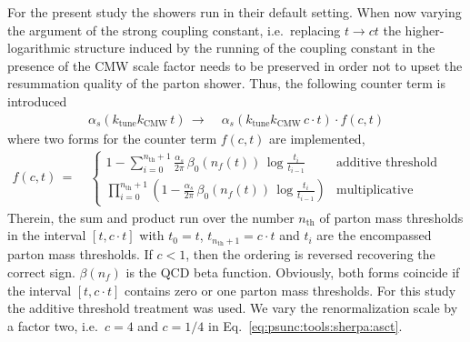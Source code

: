 For the present study the showers run in their default setting.
When now varying the argument of the strong coupling constant, i.e.\ 
replacing $t\to ct$ the higher-logarithmic structure induced by the running 
of the coupling constant in the presence of the CMW scale factor needs to be 
preserved in order not to upset the resummation quality of the parton 
shower. Thus, the following counter term is introduced
\begin{equation}
  \begin{split}\label{eq:psunc:tools:sherpa:asct}
    \alpha_s(k_\text{tune}k_\text{CMW}\,t)
    \,\to\;& \alpha_s(k_\text{tune}k_\text{CMW}\, c\cdot t)\cdot f(c,t)
  \end{split}
\end{equation}
where two forms for the counter term $f(c,t)$ are implemented,
\begin{equation}
  \begin{split}\label{eq:psunc:tools:sherpa:asctfac}
    f(c,t)
    \,=\;&\left\{\begin{array}{ll}
                  1-\sum_{i=0}^{n_\text{th}+1}\frac{\alpha_s}{2\pi}\,\beta_0(n_f(t))\,\log\frac{t_i}{t_{i-1}} & \text{additive threshold treatment}\\
                  \prod_{i=0}^{n_\text{th}+1}\left(1-\frac{\alpha_s}{2\pi}\,\beta_0(n_f(t))\,\log\frac{t_i}{t_{i-1}}\right) & \text{multiplicative threshold treatment.}
                 \end{array}\right.
  \end{split}
\end{equation}
Therein, the sum and product run over the number $n_\text{th}$ of parton mass
thresholds in the interval $[t,c\cdot t]$ with $t_0=t$,
$t_{n_\text{th}+1}=c\cdot t$ and $t_i$ are the encompassed parton mass
thresholds. If $c<1$, then the ordering is reversed recovering the correct
sign. $\beta(n_f)$ is the QCD beta function. Obviously, both forms coincide if
the interval $[t,c\cdot t]$ contains zero or one parton mass thresholds. For
this study the additive threshold treatment was used. We vary the
renormalization scale by a factor two, i.e.\ $c=4$ and $c=1/4$
in Eq.~\eqref{eq:psunc:tools:sherpa:asct}.

